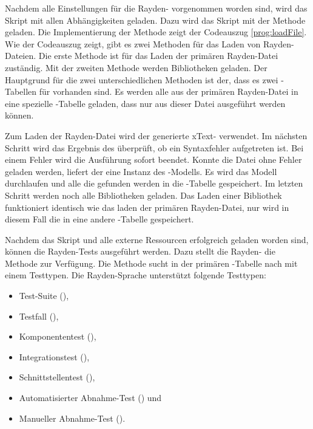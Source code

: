 \SuperPar
Nachdem alle Einstellungen für die Rayden- vorgenommen worden sind, wird das Skript mit allen Abhängigkeiten geladen. Dazu wird das Skript mit der Methode  geladen. Die Implementierung der Methode zeigt der Codeauszug \ref{prog:loadFile}. Wie der Codeauszug zeigt, gibt es zwei Methoden für das Laden von Rayden-Dateien. Die erste Methode  ist für das Laden der primären Rayden-Datei zuständig. Mit der zweiten Methode  werden Bibliotheken geladen. Der Hauptgrund für die zwei unterschiedlichen Methoden ist der, dass es zwei -Tabellen für  vorhanden sind. Es werden alle  aus der primären Rayden-Datei in eine spezielle -Tabelle geladen, dass nur  aus dieser Datei ausgeführt werden können.

\SuperPar
Zum Laden der Rayden-Datei wird der generierte xText- verwendet. Im nächsten Schritt wird das Ergebnis des  überprüft, ob ein Syntaxfehler aufgetreten ist. Bei einem Fehler wird die Ausführung sofort beendet. Konnte die Datei ohne Fehler geladen werden, liefert der  eine Instanz des -Modells. Es wird das Modell durchlaufen und alle  die gefunden werden in die -Tabelle gespeichert. Im letzten Schritt werden noch alle Bibliotheken geladen. Das Laden einer Bibliothek funktioniert identisch wie das laden der primären Rayden-Datei, nur wird in diesem Fall die  in eine andere -Tabelle gespeichert. 

\SuperPar
Nachdem das Skript und alle externe Ressourcen erfolgreich geladen worden sind, können die Rayden-Tests ausgeführt werden. Dazu stellt die Rayden- die Methode  zur Verfügung. Die Methode sucht in der primären -Tabelle nach  mit einem Testtypen. Die Rayden-Sprache unterstützt folgende Testtypen:

\begin{itemize}
\item Test-Suite (),
\item Testfall (),
\item Komponententest (),
\item Integrationstest (),
\item Schnittstellentest (),
\item Automatisierter Abnahme-Test () und
\item Manueller Abnahme-Test ().
\end{itemize}

